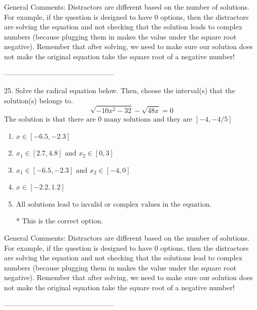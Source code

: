 \documentclass{article}[10pt]
\begin{document}
General Comments: Distractors are different based on the number of solutions. For example, if the question is designed to have 0 options, then the distractors are solving the equation and not checking that the solution leads to complex numbers (because plugging them in makes the value under the square root negative). Remember that after solving, we need to make sure our solution does not make the original equation take the square root of a negative number!

-----------------------------------------------

25. Solve the radical equation below. Then, choose the interval(s) that the solution(s) belongs to.
$$ \sqrt{-10 x^2 - 32} - \sqrt{48 x} = 0 $$ 
The solution is $ \text{that there are } 0 \text{ many solutions and they are } [-4, -4/5] $ 

\begin{enumerate}[label=\Alph*.] 
\item $ x \in [-6.5,-2.3] $ 

  
\item $ x_1 \in [2.7, 4.8] \text{ and } x_2 \in [0,3] $ 

  
\item $ x_1 \in [-6.5, -2.3] \text{ and } x_2 \in [-4,0] $ 

  
\item $ x \in [-2.2,1.2] $ 

  
\item $ \text{All solutions lead to invalid or complex values in the equation.} $ 

 * This is the correct option. 
\end{enumerate} 
 
General Comments: Distractors are different based on the number of solutions. For example, if the question is designed to have 0 options, then the distractors are solving the equation and not checking that the solutions lead to complex numbers (because plugging them in makes the value under the square root negative). Remember that after solving, we need to make sure our solution does not make the original equation take the square root of a negative number!

-----------------------------------------------
\end{document}
